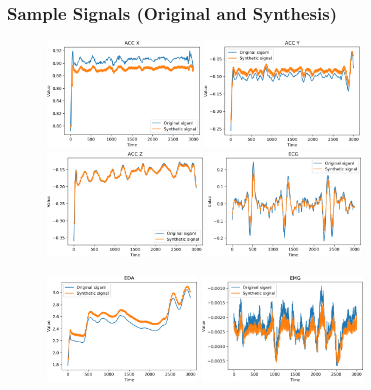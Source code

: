 \documentclass[unknownkeysallowed]{beamer}
\begin{document}
\begin{frame}
\frametitle{Sample Signals (Original and Synthesis)}

\begin{figure}
  \centering
  \includegraphics[width=.24\textwidth, height=2.8cm]{figs/sig_stress_ACC_X_acii2019_pres.png}\hfill
  \includegraphics[width=.24\textwidth, height=2.8cm]{figs/sig_stress_ACC_Y_acii2019_pres.png}\hfill
  \includegraphics[width=.24\textwidth, height=2.8cm]{figs/sig_stress_ACC_Z_acii2019_pres.png}\hfill
  \includegraphics[width=.24\textwidth, height=2.8cm]{figs/sig_stress_ECG_acii2019_pres.png}\par
  \includegraphics[width=.24\textwidth, height=2.8cm]{figs/sig_stress_EDA_acii2019_pres.png}\hfill
  \includegraphics[width=.24\textwidth, height=2.8cm]{figs/sig_stress_EMG_acii2019_pres.png}

\end{figure}
\end{frame}
\end{document}
